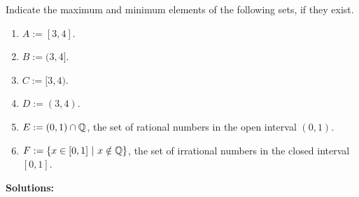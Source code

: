 \begin{example} Indicate the maximum and minimum elements of the following sets, if they exist.

\begin{enumerate}
\renewcommand{\labelenumi}{(\alph{enumi})}
\setlength{\itemsep}{.2cm}
    \item  $A:=[3, 4]$.

    \item  $B:=(3, 4]$.

    \item  $C:=[3, 4)$.

    \item $D:=(3, 4)$.

    \item $E:= (0, 1) \cap \mathbb Q$, the set of rational numbers in the open interval $(0, 1)$.
    
    \item $F:= \{ x\in  [0, 1] ~ | ~ x \notin \mathbb Q \}$, the set of irrational numbers in the closed interval $[0, 1]$.
    
\end{enumerate}
    
\end{example}

\textbf{Solutions:}

